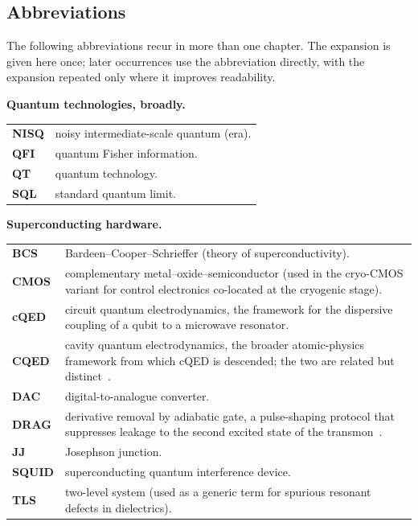 \subsection*{Abbreviations}

The following abbreviations recur in more than one chapter. The expansion is given here once; later occurrences use the abbreviation directly, with the expansion repeated only where it improves readability.

\medskip

\noindent\begin{minipage}{\linewidth}
\noindent\textbf{Quantum technologies, broadly.}

\begin{tabularx}{\linewidth}{@{}l@{\hspace{1em}}X@{}}
    \textbf{NISQ} & noisy intermediate-scale quantum (era). \\
    \textbf{QFI}  & quantum Fisher information. \\
    \textbf{QT}   & quantum technology. \\
    \textbf{SQL}  & standard quantum limit. \\
\end{tabularx}
\end{minipage}

\medskip

\noindent\begin{minipage}{\linewidth}
\noindent\textbf{Superconducting hardware.}

\begin{tabularx}{\linewidth}{@{}l@{\hspace{1em}}X@{}}
    \textbf{BCS}     & Bardeen--Cooper--Schrieffer (theory of superconductivity). \\
    \textbf{CMOS}    & complementary metal--oxide--semiconductor (used in the cryo-CMOS variant for control electronics co-located at the cryogenic stage). \\
    \textbf{cQED}    & circuit quantum electrodynamics, the framework for the dispersive coupling of a qubit to a microwave resonator. \\
    \textbf{CQED}    & cavity quantum electrodynamics, the broader atomic-physics framework from which cQED is descended; the two are related but distinct~\cite{blais2021circuit}. \\
    \textbf{DAC}     & digital-to-analogue converter. \\
    \textbf{DRAG}    & derivative removal by adiabatic gate, a pulse-shaping protocol that suppresses leakage to the second excited state of the transmon~\cite{Motzoi2009}. \\
    \textbf{JJ}      & Josephson junction. \\
    \textbf{SQUID}   & superconducting quantum interference device. \\
    \textbf{TLS}     & two-level system (used as a generic term for spurious resonant defects in dielectrics). \\
\end{tabularx}
\end{minipage}

